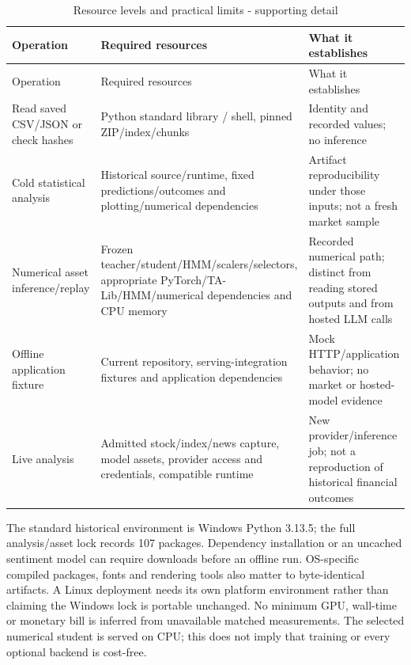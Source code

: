 \begin{longtable}[]{@{}
  >{\raggedright\arraybackslash}p{}
  >{\raggedright\arraybackslash}p{}
  >{\raggedright\arraybackslash}p{}@{}}
\caption{Resource levels and practical limits - supporting detail}\label{tab:F_reproduction:3}\tabularnewline
\toprule\noalign{}
Operation
 & Required resources
 & What it establishes
 \\
\midrule\noalign{}
\endfirsthead
\toprule\noalign{}
Operation
 & Required resources
 & What it establishes
 \\
\midrule\noalign{}
\endhead
\bottomrule\noalign{}
\endlastfoot
Read saved CSV/JSON or check hashes & Python standard library / shell, pinned ZIP/index/chunks & Identity and recorded values; no inference \\
Cold statistical analysis & Historical source/runtime, fixed predictions/outcomes and plotting/numerical dependencies & Artifact reproducibility under those inputs; not a fresh market sample \\
Numerical asset inference/replay & Frozen teacher/student/HMM/scalers/selectors, appropriate PyTorch/TA-Lib/HMM/numerical dependencies and CPU memory & Recorded numerical path; distinct from reading stored outputs and from hosted LLM calls \\
Offline application fixture & Current repository, serving-integration fixtures and application dependencies & Mock HTTP/application behavior; no market or hosted-model evidence \\
Live analysis & Admitted stock/index/news capture, model assets, provider access and credentials, compatible runtime & New provider/inference job; not a reproduction of historical financial outcomes \\
\end{longtable}

\endgroup

The standard historical environment is Windows Python 3.13.5; the full
analysis/asset lock records 107 packages. Dependency installation or an
uncached sentiment model can require downloads before an offline run.
OS-specific compiled packages, fonts and rendering tools also matter to
byte-identical artifacts. A Linux deployment needs its own platform
environment rather than claiming the Windows lock is portable unchanged.
No minimum GPU, wall-time or monetary bill is inferred from unavailable
matched measurements. The selected numerical student is served on CPU;
this does not imply that training or every optional backend is cost-free.

